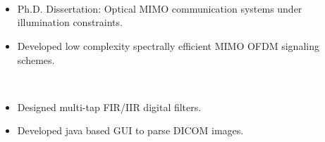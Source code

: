 
\thispagestyle{empty}

\begin{center}
\\
\vspace{0.3in}
\end{center}
\vspace{0.2in}
\vspace{0.05in}\\
 \hfill {}\\
\begin{itemize}[noitemsep,topsep=0.25em,leftmargin=1.25em]
	\item Ph.D. Dissertation: Optical MIMO communication systems under illumination constraints.
	\item Developed low complexity spectrally efficient MIMO OFDM signaling schemes.
\end{itemize}
\vspace{0.05in}
  \hfill {}\\
\begin{itemize}[noitemsep,topsep=0.25em,leftmargin=1.25em]
	\item Designed multi-tap FIR/IIR digital filters.
	\item Developed java based GUI to parse DICOM images.
\end{itemize}
\vspace{0.05in}
  \hfill {}\\
\newline\newline
